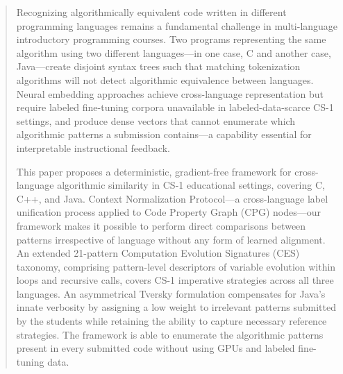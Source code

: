 \documentclass{ieeeaccess}
\begin{document}
\begin{abstract}
Recognizing algorithmically equivalent code written in different programming languages remains a fundamental challenge in multi-language introductory programming courses. Two programs representing the same algorithm using two different languages---in one case, C and another case, Java---create disjoint syntax trees such that matching tokenization algorithms will not detect algorithmic equivalence between languages. Neural embedding approaches achieve cross-language representation but require labeled fine-tuning corpora unavailable in labeled-data-scarce CS-1 settings, and produce dense vectors that cannot enumerate which algorithmic patterns a submission contains---a capability essential for interpretable instructional feedback.

This paper proposes a deterministic, gradient-free framework for cross-language algorithmic similarity in CS-1 educational settings, covering C, C++, and Java. Context Normalization Protocol---a cross-language label unification process applied to Code Property Graph (CPG) nodes—our framework makes it possible to perform direct comparisons between patterns irrespective of language without any form of learned alignment. An extended 21-pattern Computation Evolution Signatures (CES) taxonomy, comprising pattern-level descriptors of variable evolution within loops and recursive calls, covers CS-1 imperative strategies across all three languages.  An asymmetrical Tversky formulation compensates for Java’s innate verbosity by assigning a low weight to irrelevant patterns submitted by the students while retaining the ability to capture necessary reference strategies. The framework is able to enumerate the algorithmic patterns present in every submitted code without using GPUs and labeled fine-tuning data.


\end{abstract}
\end{document}
